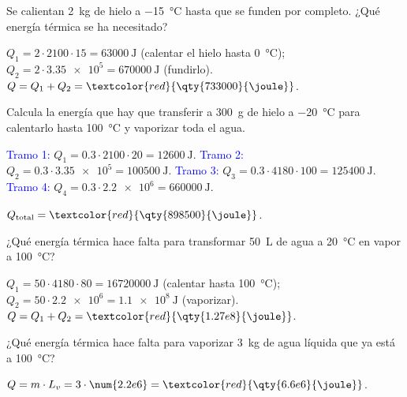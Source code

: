 \begin{exercise}
    Se calientan \qty{2}{\kg} de hielo a \qty{-15}{\degreeCelsius} hasta que se funden por completo. ¿Qué energía térmica se ha necesitado?
    \begin{solu}
        \(Q_1 = 2 \cdot 2100 \cdot 15 = \qty{63000}{\joule}\) (calentar el hielo hasta \qty{0}{\degreeCelsius}); \(Q_2 = 2 \cdot \num{3.35e5} = \qty{670000}{\joule}\) (fundirlo).
        \(Q = Q_1 + Q_2 = \textcolor{red}{\qty{733000}{\joule}}\).
    \end{solu}
\end{exercise}

\begin{exercise}
    Calcula la energía que hay que transferir a \qty{300}{\gram} de hielo a \qty{-20}{\degreeCelsius} para calentarlo hasta \qty{100}{\degreeCelsius} y vaporizar toda el agua.
    \begin{solu}
        \textcolor{blue}{Tramo 1:} \(Q_1 = \num{0.3} \cdot 2100 \cdot 20 = \qty{12600}{\joule}\). \textcolor{blue}{Tramo 2:} \(Q_2 = \num{0.3} \cdot \num{3.35e5} = \qty{100500}{\joule}\).
        \textcolor{blue}{Tramo 3:} \(Q_3 = \num{0.3} \cdot 4180 \cdot 100 = \qty{125400}{\joule}\). \textcolor{blue}{Tramo 4:} \(Q_4 = \num{0.3} \cdot \num{2.2e6} = \qty{660000}{\joule}\).

        \(Q_{\text{total}} = \textcolor{red}{\qty{898500}{\joule}}\).
    \end{solu}
\end{exercise}

\begin{exercise}
    ¿Qué energía térmica hace falta para transformar \qty{50}{\liter} de agua a \qty{20}{\degreeCelsius} en vapor a \qty{100}{\degreeCelsius}?
    \begin{solu}
        \(Q_1 = 50 \cdot 4180 \cdot 80 = \qty{16720000}{\joule}\) (calentar hasta \qty{100}{\degreeCelsius}); \(Q_2 = 50 \cdot \num{2.2e6} = \qty{1.1e8}{\joule}\) (vaporizar).
        \(Q = Q_1 + Q_2 = \textcolor{red}{\qty{1.27e8}{\joule}}\).
    \end{solu}
\end{exercise}

\begin{exercise}
    ¿Qué energía térmica hace falta para vaporizar \qty{3}{\kg} de agua líquida que ya está a \qty{100}{\degreeCelsius}?
    \begin{solu}
        \(Q = m \cdot L_v = 3 \cdot \num{2.2e6} = \textcolor{red}{\qty{6.6e6}{\joule}}\).
    \end{solu}
\end{exercise}

